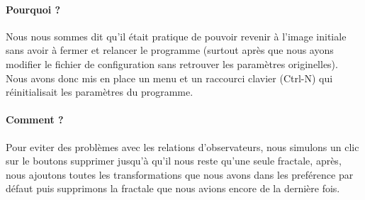 \documentclass[a4paper]{report}
\begin{document}
\paragraph{Pourquoi ?}
Nous nous sommes dit qu'il était pratique de pouvoir revenir à l'image initiale sans avoir à fermer et relancer le programme (surtout après que nous ayons modifier le fichier de configuration sans retrouver les paramètres originelles). Nous avons donc mis en place un menu et un raccourci clavier (Ctrl-N) qui réinitialisait les paramètres du programme.

\paragraph{Comment ?}
Pour eviter des problèmes avec les relations d'observateurs, nous simulons un clic sur le boutons supprimer jusqu'à qu'il nous reste qu'une seule fractale, après, nous ajoutons toutes les transformations que nous avons dans les preférence par défaut puis supprimons la fractale que nous avions encore de la dernière fois.
\end{document}
